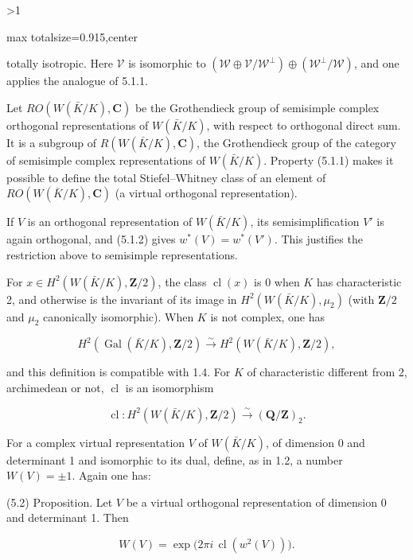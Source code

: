 \documentclass[9pt,twoside]{extarticle}
\newcommand{\EditionPage}[3]{%
  \ifnum#1>1\clearpage\fi
  \pdfbookmark[1]{Printed folio #2}{en-folio-#2}%
  \hypertarget{en-page-#1}{}%
  \noindent\begin{adjustbox}{max totalsize={\textwidth}{0.915\textheight},center}
  \begin{minipage}[t]{\textwidth}
  \fontsize{8.45}{10.05}\selectfont\justifying
  #3
  \end{minipage}
  \end{adjustbox}%
}
\begin{document}
\EditionPage{16}{314}{%
totally isotropic. Here \(\mathscr V\) is isomorphic to \((\mathscr W\oplus\mathscr V/\mathscr W^\perp)\oplus(\mathscr W^\perp/\mathscr W)\), and one applies the analogue of 5.1.1.\par

Let \(RO(W(\bar K/K),\mathbf C)\) be the Grothendieck group of semisimple complex orthogonal representations of \(W(\bar K/K)\), with respect to orthogonal direct sum. It is a subgroup of \(R(W(\bar K/K),\mathbf C)\), the Grothendieck group of the category of semisimple complex representations of \(W(\bar K/K)\). Property (5.1.1) makes it possible to define the total Stiefel--Whitney class of an element of \(RO(W(\bar K/K),\mathbf C)\) (a virtual orthogonal representation).\par

If \(V\) is an orthogonal representation of \(W(\bar K/K)\), its semisimplification \(V'\) is again orthogonal, and (5.1.2) gives \(w^*(V)=w^*(V')\). This justifies the restriction above to semisimple representations.\par

For \(x\in H^2(W(\bar K/K),\mathbf Z/2)\), the class \(\operatorname{cl}(x)\) is 0 when \(K\) has characteristic 2, and otherwise is the invariant of its image in \(H^2(W(\bar K/K),\mu_2)\) (with \(\mathbf Z/2\) and \(\mu_2\) canonically isomorphic). When \(K\) is not complex, one has\par

\[
H^2(\operatorname{Gal}(\bar K/K),\mathbf Z/2)\xrightarrow{\sim}H^2(W(\bar K/K),\mathbf Z/2),
\]

and this definition is compatible with 1.4. For \(K\) of characteristic different from 2, archimedean or not, \(\operatorname{cl}\) is an isomorphism\par

\[
\operatorname{cl}:H^2(W(\bar K/K),\mathbf Z/2)\xrightarrow{\sim}(\mathbf Q/\mathbf Z)_2.
\]

For a complex virtual representation \(V\) of \(W(\bar K/K)\), of dimension 0 and determinant 1 and isomorphic to its dual, define, as in 1.2, a number \(W(V)=\pm1\). Again one has:\par

(5.2) Proposition. Let \(V\) be a virtual orthogonal representation of dimension 0 and determinant 1. Then\par

\[
W(V)=\exp\bigl(2\pi i\,\operatorname{cl}(w^2(V))\bigr).
\]

}
\end{document}
